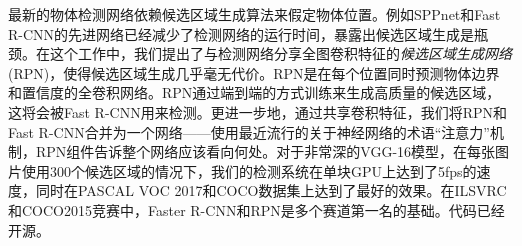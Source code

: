 \documentclass[../main.tex]{subfile}
\begin{document}
最新的物体检测网络依赖候选区域生成算法来假定物体位置。例如SPPnet\cite{spp}和Fast R-CNN\cite{fastrcnn}的先进网络已经减少了检测网络的运行时间，暴露出候选区域生成是瓶颈。在这个工作中，我们提出了与检测网络分享全图卷积特征的\textit{候选区域生成网络}(RPN)，使得候选区域生成几乎毫无代价。RPN是在每个位置同时预测物体边界和置信度的全卷积网络。RPN通过端到端的方式训练来生成高质量的候选区域，这将会被Fast R-CNN用来检测。更进一步地，通过共享卷积特征，我们将RPN和Fast R-CNN合并为一个网络——使用最近流行的关于神经网络的术语“注意力”机制，RPN组件告诉整个网络应该看向何处。对于非常深的VGG-16\cite{vgg}模型，在每张图片使用300个候选区域的情况下，我们的检测系统在单块GPU上达到了5fps的速度，同时在PASCAL VOC 2017和COCO数据集上达到了最好的效果。在ILSVRC和COCO2015竞赛中，Faster R-CNN和RPN是多个赛道第一名的基础。代码已经开源。
\end{document}
